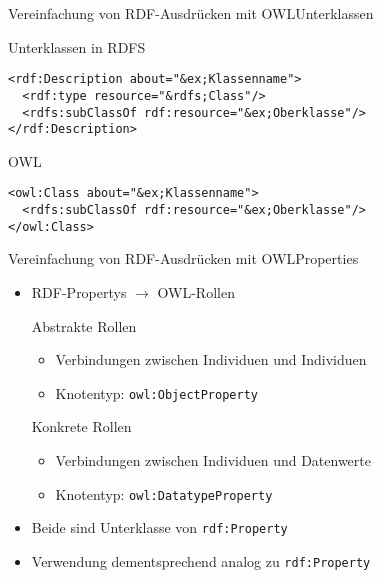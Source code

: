 \documentclass{beamer}
\begin{document}
\begin{frame}[fragile]{Vereinfachung von RDF-Ausdrücken mit
OWL}{Unterklassen}
\begin{block}{Unterklassen in RDFS}
\begin{lstlisting}[lang="xml"]
<rdf:Description about="&ex;Klassenname">
  <rdf:type resource="&rdfs;Class"/>
  <rdfs:subClassOf rdf:resource="&ex;Oberklasse"/>
</rdf:Description>
\end{lstlisting}
\end{block}
\begin{block}{OWL}
\begin{lstlisting}[lang="xml"]
<owl:Class about="&ex;Klassenname">
  <rdfs:subClassOf rdf:resource="&ex;Oberklasse"/>
</owl:Class>
\end{lstlisting}
\end{block}

\end{frame}

\begin{frame}[fragile]{Vereinfachung von RDF-Ausdrücken mit OWL}{Properties}
\begin{itemize}
\item RDF-Propertys $\rightarrow$ OWL-Rollen
\begin{block}{Abstrakte Rollen}
\begin{itemize}
\item Verbindungen zwischen Individuen und Individuen
\item Knotentyp: \tt owl:ObjectProperty
\end{itemize}
\end{block}

\begin{block}{Konkrete Rollen}
\begin{itemize}
\item Verbindungen zwischen Individuen und Datenwerte
\item Knotentyp: \tt owl:DatatypeProperty
\end{itemize}
\end{block}

\item Beide sind Unterklasse von \texttt{rdf:Property}
\item Verwendung dementsprechend analog zu \texttt{rdf:Property}

\end{itemize}
\end{frame}


\end{document}
